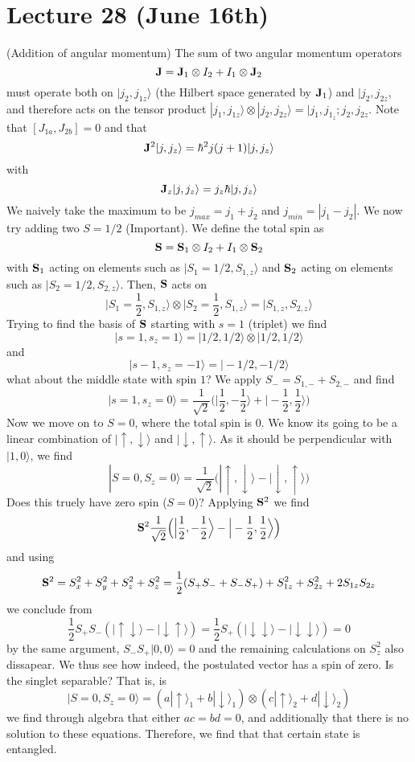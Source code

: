 \section{Lecture 28 (June 16th)}
\begin{thm}
(Addition of angular momentum) The sum of two angular momentum operators 
\[{\bf J}={\bf J}_{1}\otimes I_2+I_1\otimes {\bf J}_{2}\]
must operate both on $|j_2,j_{1z}\rangle $ (the Hilbert space generated by ${\bf J}_1$) and $|j_2,j_{2z}$, and therefore acts on the tensor product $|j_1,j_{1z}\rangle \otimes |j_2,j_{2z}\rangle =|j_1,j_1_{z};j_2,j_{2z}$. Note that $[J_{1a},J_{2b}]=0$ and that 
\[{\bf J}^2|j,j_{z}\rangle =\hbar ^2j(j+1)|j,j_{z}\rangle \]
with
\[{\bf J}_{z}|j,j_{z}\rangle =j_{z}\hbar |j,j_{z}\rangle \]
We naively take the maximum to be $j_{max}=j_1+j_2$ and $j_{min}=|j_1-j_2|$. We now try adding two $S=1/2$ (Important). We define the total spin as
\[{\bf S}={\bf S}_{1}\otimes I_{2}+I_{1}\otimes {\bf S}_{2}\]
with ${\bf S}_{1}$ acting on elements such as $|S_1=1/2,S_{1,z}\rangle $ and ${\bf S}_{2}$ acting on elements such as $|S_2=1/2,S_{2,z}\rangle $. Then, ${\bf S}$ acts on
\[\Big|S_{1}=\dfrac{1}{2},S_{1,z}\Big\rangle \otimes \Big|S_{2}=\dfrac{1}{2},S_{1,z}\Big\rangle=|S_{1,z},S_{2,z}\rangle \]
Trying to find the basis of ${\bf S}$ starting with $s=1$ (triplet) we find
\[|s=1,s_{z}=1\rangle =|1/2,1/2\rangle \otimes |1/2,1/2\rangle \]
and
\[|s-1,s_{z}=-1\rangle =|-1/2,-1/2\rangle \]
what about the middle state with spin $1$? We apply $S_{-}=S_{1,-}+S_{2,-}$ and find
\[|s=1,s_{z}=0\rangle =\dfrac{1}{\sqrt{2}}\Big(\Big|\dfrac{1}{2},-\dfrac{1}{2}\Big\rangle +\Big|-\dfrac{1}{2},\dfrac{1}{2}\Big\rangle \Big)\]
Now we move on to $S=0$, where the total spin is $0$. We know its going to be a linear combination of $|\uparrow,\downarrow\rangle $ and $|\downarrow,\uparrow\rangle $. As it should be perpendicular with $|1,0\rangle $, we find 
\[|S=0, S_{z}=0\rangle =\dfrac{1}{\sqrt{2}}\Big(|\uparrow,\downarrow\rangle -|\downarrow,\uparrow\rangle \Big)\]
Does this truely have zero spin ($S=0$)? Applying ${\bf S}^2$ we find
\[{\bf S}^2\dfrac{1}{\sqrt{2}}\Big(\Big|\dfrac{1}{2},-\dfrac{1}{2}\Big\rangle-\Big|-\dfrac{1}{2},\dfrac{1}{2}\Big\rangle  \Big) \]
and using
\[{\bf S}^2=S_{x}^2+S_{y}^2+S_{z}^2+S_{z}^2=\dfrac{1}{2}(S_{+}S_{-}+S_{-}S_{+})+S_{1z}^2+S_{2z}^2+2S_{1z}S_{2z}\]
we conclude from
\[\dfrac{1}{2}S_{+}S_{-}(|\uparrow\downarrow\rangle -|\downarrow\uparrow\rangle )=\dfrac{1}{2}S_{+}(|\downarrow\downarrow\rangle -|\downarrow\downarrow\rangle )=0\]
by the same argument, $S_{-}S_{+}|0,0\rangle=0 $ and the remaining calculations on $S_{z}^2$ also dissapear. We thus see how indeed, the postulated vector has a spin of zero. Is the singlet separable? That is, is 
\[|S=0,S_{z}=0\rangle =(a|\uparrow\rangle _{1}+b|\downarrow\rangle _{1})\otimes(c|\uparrow\rangle _{2}+d|\downarrow\rangle _{2}) \]
we find through algebra that either $ac=bd=0$, and additionally that there is no solution to these equations. Therefore, we find that that certain state is entangled. 
\end{thm}
\vspace{2ex}

